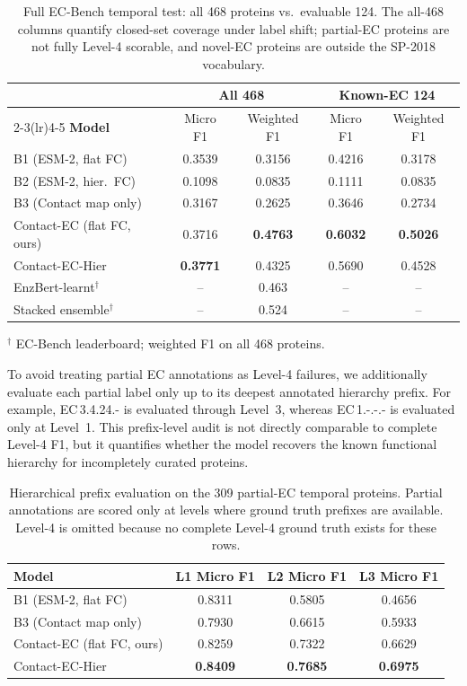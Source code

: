 \documentclass[11pt,a4paper]{article}
\begin{document}
\begin{table}[htbp]
\centering
\caption{Full EC-Bench temporal test: all 468 proteins vs.\ evaluable 124.
  The all-468 columns quantify closed-set coverage under label shift; partial-EC
  proteins are not fully Level-4 scorable, and novel-EC proteins are outside the
  SP-2018 vocabulary.}
\label{tab:full468}
\setlength{\tabcolsep}{5pt}
\begin{tabular}{lcccc}
\toprule
& \multicolumn{2}{c}{\textbf{All 468}} & \multicolumn{2}{c}{\textbf{Known-EC 124}} \\
\cmidrule(lr){2-3}\cmidrule(lr){4-5}
\textbf{Model} & Micro F1 & Weighted F1 & Micro F1 & Weighted F1 \\
\midrule
B1 (ESM-2, flat FC)     & 0.3539 & 0.3156 & 0.4216 & 0.3178 \\
B2 (ESM-2, hier.\ FC)   & 0.1098 & 0.0835 & 0.1111 & 0.0835 \\
B3 (Contact map only)   & 0.3167 & 0.2625 & 0.3646 & 0.2734 \\
Contact-EC (flat FC, ours) & 0.3716 & \textbf{0.4763} & \textbf{0.6032} & \textbf{0.5026} \\
\midrule
Contact-EC-Hier             & \textbf{0.3771} & 0.4325 & 0.5690 & 0.4528 \\
\midrule
EnzBert-learnt$^\dagger$ & -- & 0.463 & -- & -- \\
Stacked ensemble$^\dagger$ & -- & 0.524 & -- & -- \\
\bottomrule
\end{tabular}
{\small $^\dagger$ EC-Bench leaderboard; weighted F1 on all 468 proteins.}
\end{table}

To avoid treating partial EC annotations as Level-4 failures, we additionally
evaluate each partial label only up to its deepest annotated hierarchy prefix.
For example, EC\,3.4.24.- is evaluated through Level~3, whereas EC\,1.-.-.- is
evaluated only at Level~1. This prefix-level audit is not directly comparable to
complete Level-4 F1, but it quantifies whether the model recovers the known
functional hierarchy for incompletely curated proteins.

\begin{table}[htbp]
\centering
\caption{Hierarchical prefix evaluation on the 309 partial-EC temporal proteins.
Partial annotations are scored only at levels where ground truth prefixes are
available. Level-4 is omitted because no complete Level-4 ground truth exists for
these rows.}
\label{tab:partial_prefix}
\setlength{\tabcolsep}{6pt}
\begin{tabular}{lccc}
\toprule
\textbf{Model} & L1 Micro F1 & L2 Micro F1 & L3 Micro F1 \\
\midrule
B1 (ESM-2, flat FC)        & 0.8311 & 0.5805 & 0.4656 \\
B3 (Contact map only)      & 0.7930 & 0.6615 & 0.5933 \\
Contact-EC (flat FC, ours) & 0.8259 & 0.7322 & 0.6629 \\
Contact-EC-Hier            & \textbf{0.8409} & \textbf{0.7685} & \textbf{0.6975} \\
\bottomrule
\end{tabular}
\end{table}
\end{document}
